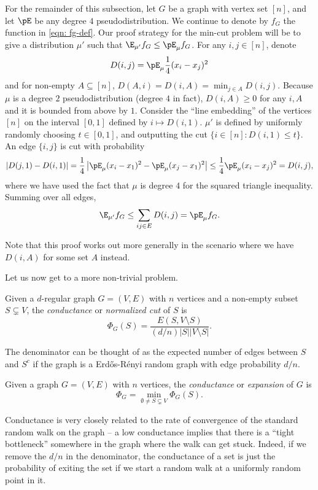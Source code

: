 	For the remainder of this subsection, let $G$ be a graph with vertex set $[n]$, and let $\pE$ be any degree $4$ pseudodistribution. We continue to denote by $f_G$ the function in \cref{eqn: fg-def}. Our proof strategy for the min-cut problem will be to give a distribution $\mu'$ such that $\E_{\mu'} f_G \le \pE_{\mu} f_G$. For any $i,j \in [n]$, denote
	\[ D(i,j) = \pE_{\mu} \frac{1}{4} (x_i - x_j)^2 \]
	and for non-empty $A \subseteq [n]$, $D(A,i) = D(i,A) = \min_{j \in A} D(i,j)$. Because $\mu$ is a degree $2$ pseudodistribution (degree $4$ in fact), $D(i,A) \ge 0$ for any $i,A$ and it is bounded from above by $1$. Consider the ``line embedding'' of the vertices $[n]$ on the interval $[0,1]$ defined by $i \mapsto D(i,1)$. $\mu'$ is defined by uniformly randomly choosing $t \in [0,1]$, and outputting the cut $\{i \in [n] : D(i,1) \le t\}$. An edge $\{i,j\}$ is cut with probability
	\[ |D(j,1) - D(i,1)| = \frac{1}{4} \left|\pE_{\mu} (x_i - x_1)^2 - \pE_{\mu} (x_j - x_1)^2 \right| \le \frac{1}{4} \pE_\mu (x_i - x_j)^2 = D(i,j), \]
	where we have used the fact that $\mu$ is degree $4$ for the squared triangle inequality.
	Summing over all edges,
	\[ \E_{\mu'} f_G \le \sum_{ij \in E} D(i,j) = \pE_{\mu} f_G. \]

	Note that this proof works out more generally in the scenario where we have $D(i,A)$ for some set $A$ instead.

	Let us now get to a more non-trivial problem.

	\begin{fdef}
		Given a $d$-regular graph $G = (V,E)$ with $n$ vertices and a non-empty subset $S \subsetneq V$, the \emph{conductance} or \emph{normalized cut} of $S$ is
		\[ \Phi_G(S) = \frac{E(S,V \setminus S)}{(d/n) |S| |V \setminus S|}. \] 
	\end{fdef}
	The denominator can be thought of as the expected number of edges between $S$ and $S^c$ if the graph is a Erd\H{o}s-R\'{e}nyi random graph with edge probability $d/n$.

	\begin{fdef}
		Given a graph $G = (V,E)$ with $n$ vertices, the \emph{conductance} or \emph{expansion} of $G$ is
		\[ \Phi_G = \min_{\emptyset \ne S \subsetneq V} \Phi_G(S). \]
	\end{fdef}
	Conductance is very closely related to the rate of convergence of the standard random walk on the graph -- a low conductance implies that there is a ``tight bottleneck'' somewhere in the graph where the walk can get stuck. Indeed, if we remove the $d/n$ in the denominator, the conductance of a set is just the probability of exiting the set if we start a random walk at a uniformly random point in it.\\

